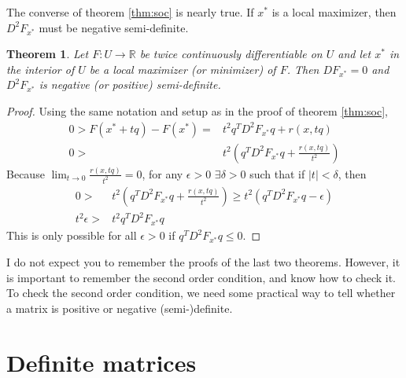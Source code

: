 \documentclass[12pt,reqno]{amsart}
\newtheorem{theorem}{Theorem}[section]
\theoremstyle{definition}
\def\R{\mathbb{R}}
\renewcommand{\to}{{\rightarrow}}
\begin{document}
The converse of theorem \ref{thm:soc} is nearly true. If $x^*$ is a
local maximizer, then $D^2 F_{x^*}$ must be negative semi-definite.
\begin{theorem}
  Let $F: U \to \R$ be twice continuously differentiable on $U$ and
  let $x^*$ in the interior of $U$ be a local maximizer (or minimizer) of
  $F$. Then $DF_{x^*} = 0$ and $D^2 F_{x^*}$ is negative (or positive)
  semi-definite. 
\end{theorem}
\begin{proof}
  Using the same notation and setup as in the proof of theorem
  \ref{thm:soc}, 
  \begin{align*}
    0 > F(x^* + tq ) - F(x^*) = & t^2 q^T D^2 F_{x^*} q + r(x,tq)  \\
    0 >  & t^2\left(q^T D^2 F_{x^*} q + \frac{r(x,tq)}{t^2} \right) 
  \end{align*}
  Because $\lim_{t \to 0} \frac{r(x,tq)}{t^2} = 0$, for any $\epsilon
  >0$ $\exists \delta > 0$ such that if $|t|< \delta$, then
  \begin{align*}
    0 > & t^2\left(q^T D^2 F_{x^*} q + \frac{r(x,tq)}{t^2} \right) \geq  t^2
    \left(q^T D^2 F_{x^*} q - \epsilon \right) \\
    t^2 \epsilon >& t^2 q^T D^2 F_{x^*} q 
  \end{align*}
  This is only possible for all $\epsilon >0$ if $q^T D^2 F_{x^*}
  q\leq 0$. 
\end{proof}
I do not expect you to remember the proofs of the last two
theorems. However, it is important to remember the second order
condition, and know how to check it. To check the second order
condition, we need some practical way to tell whether a matrix is
positive or negative (semi-)definite. 

\section{Definite matrices}
\end{document}
